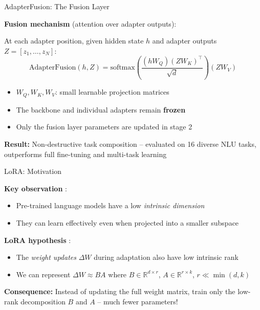 \documentclass[11pt,compress,t,notes=noshow, xcolor=table]{beamer}
\begin{document}

\begin{frame}{AdapterFusion: The Fusion Layer}

\vfill

\textbf{Fusion mechanism} (attention over adapter outputs):

At each adapter position, given hidden state $h$ and adapter outputs $Z = [z_1, \ldots, z_N]$:
$$\text{AdapterFusion}(h, Z) = \text{softmax}\!\left(\frac{(hW_Q)(ZW_K)^\top}{\sqrt{d}}\right) (ZW_V)$$

\begin{itemize}
  \item $W_Q, W_K, W_V$: small learnable projection matrices
  \item The backbone and individual adapters remain \textbf{frozen}
  \item Only the fusion layer parameters are updated in stage 2
\end{itemize}

\vfill

\textbf{Result:} Non-destructive task composition -- evaluated on 16 diverse NLU tasks, outperforms full fine-tuning and multi-task learning

\vfill

\end{frame}


\begin{frame}{LoRA: Motivation}

\vfill

\textbf{Key observation} :
\begin{itemize}
  \item Pre-trained language models have a low \textit{intrinsic dimension}
  \item They can learn effectively even when projected into a smaller subspace
\end{itemize}

\vfill

\textbf{LoRA hypothesis} :
\begin{itemize}
  \item The \textit{weight updates} $\Delta W$ during adaptation also have low intrinsic rank
  \item We can represent $\Delta W \approx BA$ where $B \in \mathbb{R}^{d \times r}$, $A \in \mathbb{R}^{r \times k}$, $r \ll \min(d, k)$
\end{itemize}

\vfill

\textbf{Consequence:} Instead of updating the full weight matrix, train only the low-rank decomposition $B$ and $A$ -- much fewer parameters!

\vfill

\end{frame}
\end{document}
